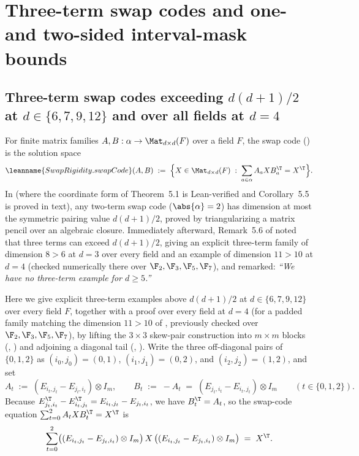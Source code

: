 \section{Three-term swap codes and one- and two-sided interval-mask bounds}\label{sec:swapcodes}

\subsection{Three-term swap codes exceeding \texorpdfstring{$d(d+1)/2$}{d(d+1)/2} at \texorpdfstring{$d \in \{6, 7, 9, 12\}$}{d in \{6, 7, 9, 12\}} and over all fields at \texorpdfstring{$d = 4$}{d = 4}}\label{sec:remark-5-6}

For finite matrix families $A, B : \alpha \to \Mat_{d\times d}(F)$ over a field $F$, the swap code
() is the solution space
\[
  \leanname{SwapRigidity.swapCode}(A, B)
  \;:=\;
  \Bigl\{X \in \Mat_{d\times d}(F) \;:\; \sum_{a \in \alpha} A_a X B_a^{\T} = X^{\T}\Bigr\}.
\]
In \cite[Theorem~5.1 and Corollary~5.5]{SeventeenthPaper2026} (where the coordinate form of
Theorem~5.1 is Lean-verified and Corollary~5.5 is proved in text), any two-term
swap code ($\abs{\alpha} = 2$) has dimension at most the symmetric pairing value $d(d+1)/2$, proved
by triangularizing a matrix pencil over an algebraic closure. Immediately afterward, Remark~5.6 of
\cite{SeventeenthPaper2026} noted that three terms can exceed $d(d+1)/2$, giving an
explicit three-term family of dimension $8 > 6$ at $d = 3$ over every field and an example of
dimension $11 > 10$ at $d = 4$ (checked numerically there over $\F_2, \F_3, \F_5, \F_7$),
and remarked: \emph{``We have no three-term example for $d \ge 5$.''}

Here we give explicit three-term examples above $d(d+1)/2$ at $d \in \{6, 7, 9, 12\}$ over every
field $F$, together with a proof over every field at $d = 4$ (for a padded family matching the
dimension $11 > 10$ of \cite[Remark~5.6]{SeventeenthPaper2026}, previously checked over
$\F_2, \F_3, \F_5, \F_7$), by lifting the $3 \times 3$ skew-pair construction into $m \times m$
blocks (, ) and adjoining a diagonal tail
(, ). Write the three off-diagonal pairs of $\{0,1,2\}$
as $(i_0,j_0) = (0,1)$, $(i_1,j_1) = (0,2)$, and $(i_2,j_2) = (1,2)$, and set
\[
  A_t \;:=\; (E_{i_t, j_t} - E_{j_t, i_t}) \otimes I_m,
  \qquad
  B_t \;:=\; -A_t \;=\; (E_{j_t, i_t} - E_{i_t, j_t}) \otimes I_m
  \qquad (t \in \{0,1,2\}).
\]
Because $E_{j_t, i_t}^{\T} - E_{i_t, j_t}^{\T} = E_{i_t, j_t} - E_{j_t, i_t}$, we have
$B_t^{\T} = A_t$, so the swap-code equation $\sum_{t=0}^2 A_t X B_t^{\T} = X^{\T}$ is
\[
  \sum_{t=0}^2 \bigl((E_{i_t, j_t} - E_{j_t, i_t}) \otimes I_m\bigr)\,X\,
    \bigl((E_{i_t, j_t} - E_{j_t, i_t}) \otimes I_m\bigr)
  \;=\;
  X^{\T}.
\]

